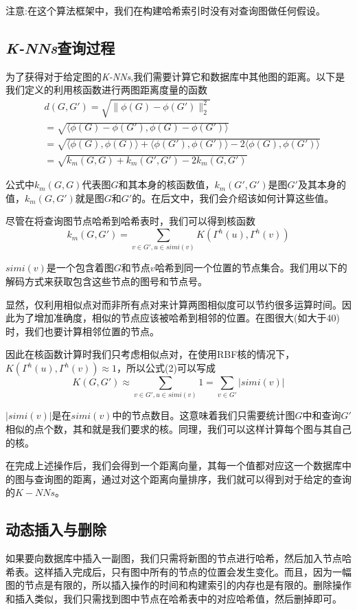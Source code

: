\documentclass{article}
\begin{document}
注意:在这个算法框架中，我们在构建哈希索引时没有对查询图做任何假设。



\subsection{\emph{K-NNs}查询过程}
为了获得对于给定图的\emph{K-NNs},我们需要计算它和数据库中其他图的距离。以下是我们定义的利用核函数进行两图距离度量的函数
\begin{equation}
\begin{split}
    &d(G,G')=\sqrt{\|\phi(G)-\phi(G')\|_{2}^{2}}\\
              &=\sqrt{\langle\phi(G)-\phi(G'),\phi(G)-\phi(G')\rangle}\\
              &=\sqrt{\langle\phi(G),\phi(G)\rangle+\langle\phi(G'),\phi(G')\rangle-2\langle\phi(G),\phi(G')\rangle}\\
              &=\sqrt{k_{m}(G,G)+k_{m}(G',G')-2k_{m}(G,G')}
\end{split}
\end{equation}

公式中$k_{m}(G,G)$代表图$G$和其本身的核函数值，$k_{m}(G',G')$是图$G'$及其本身的值，$k_{m}(G,G')$就是图$G$和$G'$的。在后文中，我们会介绍该如何计算这些值。

尽管在将查询图节点哈希到哈希表时，我们可以得到核函数
\begin{equation}
k_{m}(G,G')=\sum_{v\in G',u\in simi(v)}K(\Gamma^{h}(u),\Gamma^{h}(v))
\end{equation}

$simi(v)$是一个包含着图$G$和节点$v$哈希到同一个位置的节点集合。我们用以下的解码方式来获取包含这些节点的图号和节点号。

显然，仅利用相似点对而非所有点对来计算两图相似度可以节约很多运算时间。因此为了增加准确度，相似的节点应该被哈希到相邻的位置。在图很大(如大于40)时，我们也要计算相邻位置的节点。

因此在核函数计算时我们只考虑相似点对，在使用RBF核的情况下，$K(\Gamma^{h}(u),\Gamma^{h}(v))\approx1$，所以公式(2)可以写成
\begin{equation}
    K(G,G')\approx\sum_{v\in G',u\in simi(v)}1=\sum_{v\in G'}|simi(v)| 
\end{equation}

$|simi(v)|$是在$simi(v)$中的节点数目。这意味着我们只需要统计图$G$中和查询$G'$相似的点个数，其和就是我们要求的核。同理，我们可以这样计算每个图与其自己的核。

在完成上述操作后，我们会得到一个距离向量，其每一个值都对应这一个数据库中的图与查询图的距离，通过对这个距离向量排序，我们就可以得到对于给定的查询的$K-NNs$。

\subsection{动态插入与删除}
如果要向数据库中插入一副图，我们只需将新图的节点进行哈希，然后加入节点哈希表。这样插入完成后，只有图中所有的节点的位置会发生变化。而且，因为一幅图的节点是有限的，所以插入操作的时间和构建索引的内存也是有限的。删除操作和插入类似，我们只需找到图中节点在哈希表中的对应哈希值，然后删掉即可。

\ifx\allfiles\undefined
\renewcommand\refname{参考文献}


\end{document}
